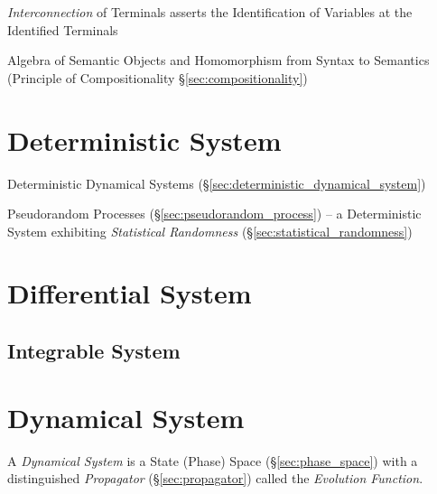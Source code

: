 \emph{Interconnection} of Terminals asserts the Identification of
Variables at the Identified Terminals

Algebra of Semantic Objects and Homomorphism from Syntax to Semantics
(Principle of Compositionality \S\ref{sec:compositionality})



\section{Deterministic System}\label{sec:deterministic_system}

\fist Deterministic Dynamical Systems
(\S\ref{sec:deterministic_dynamical_system})

\fist Pseudorandom Processes (\S\ref{sec:pseudorandom_process}) -- a
Deterministic System exhibiting \emph{Statistical Randomness}
(\S\ref{sec:statistical_randomness})



\section{Differential System}\label{sec:differential_system}




\subsection{Integrable System}\label{sec:integrable_system}



\section{Dynamical System}\label{sec:dynamical_system}

A \emph{Dynamical System} is a State (Phase) Space (\S\ref{sec:phase_space})
with a distinguished \emph{Propagator} (\S\ref{sec:propagator}) called the
\emph{Evolution Function}.

